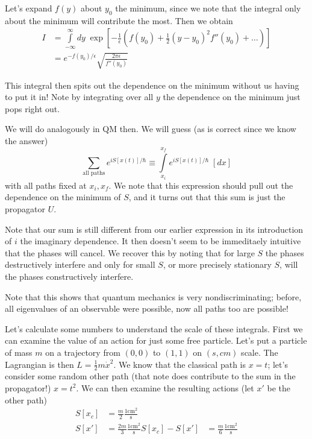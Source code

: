 \documentclass[10pt]{report}
\begin{document}
Let's expand $f(y)$ about $y_0$ the minimum, since we note that the integral only about the minimum will contribute the most. Then we obtain
\begin{align}
    I &= \int\limits_{-\infty}^{\infty}dy\;\exp\left[ -\frac{1}{\epsilon}\left( f(y_0) + \frac{1}{2}(y-y_0)^2f''(y_0) +\dots \right) \right]\\
    &= e^{-f(y_0)/\epsilon}\sqrt{\frac{2\pi\epsilon}{f''(y_0)}}
\end{align}

This integral then spits out the dependence on the minimum without us having to put it in! Note by integrating over all $y$ the dependence on the minimum just pops right out.

We will do analogously in QM then. We will guess (as is correct since we know the answer)
\begin{equation}
    \sum_{\text{all paths}}^{} e^{iS[x(t)]/\hbar} \equiv \int\limits_{x_i}^{x_f}e^{iS[x(t)]/\hbar}\;[dx]
\end{equation}
with all paths fixed at $x_i, x_f$. We note that this expression should pull out the dependence on the minimum of $S$, and it turns out that this sum is just the propagator $U$.

Note that our sum is still different from our earlier expression in its introduction of $i$ the imaginary dependence. It then doesn't seem to be immeditaely intuitive that the phases will cancel. We recover this by noting that for large $S$ the phases destructively interfere and only for small $S$, or more precisely stationary $S$, will the phases constructively interfere.

Note that this shows that quantum mechanics is very nondiscriminating; before, all eigenvalues of an observable were possible, now all paths too are possible!

Let's calculate some numbers to understand the scale of these integrals. First we can examine the value of an action for just some free particle. Let's put a particle of mass $m$ on a trajectory from $(0,0)$ to $(1,1)$ on $(s, cm)$ scale. The Lagrangian is then $L = \frac{1}{2}m\dot{x}^2$. We know that the classical path is $x = t$; let's consider some random other path (that note does contribute to the sum in the propagator!) $x = t^2$. We can then examine the resulting actions (let $x'$ be the other path)
\begin{align}
    S[x_c] &= \frac{m}{2}\frac{1\mathrm{cm^2}}{\mathrm{s}}\\
    S[x'] &= \frac{2m}{3}\frac{1\mathrm{cm^2}}{\mathrm{s}}
    S[x_c] - S[x'] &= \frac{m}{6}\frac{1\mathrm{cm^2}}{\mathrm{s}}
\end{align}
\end{document}
